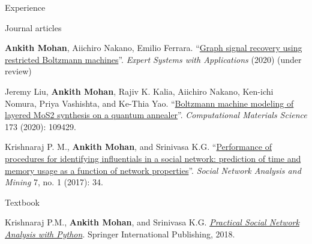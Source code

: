 \documentclass{resume} %
\begin{document}
\begin{rSection}{Experience}
\end{rSection}



\begin{rSection}{Journal articles}

\item \textbf{Ankith Mohan}, Aiichiro Nakano, Emilio Ferrara.
``\href{https://arxiv.org/pdf/2011.10549.pdf}{Graph signal recovery using restricted Boltzmann machines}''. 
{\it Expert Systems with Applications} (2020) (under review)

\item Jeremy Liu, \textbf{Ankith Mohan}, Rajiv K. Kalia, Aiichiro Nakano, Ken-ichi Nomura, Priya Vashishta, and Ke-Thia Yao. ``\href{http://cacs.usc.edu/papers/Liu-QLBM-CMS20.pdf}{Boltzmann machine modeling of layered MoS2 synthesis on a quantum annealer}''. {\em Computational Materials Science} 173 (2020): 109429.

\item Krishnaraj P. M., \textbf{Ankith Mohan}, and Srinivasa K.G. ``\href{https://www.researchgate.net/publication/318762687_Performance_of_procedures_for_identifying_influentials_in_a_social_network_prediction_of_time_and_memory_usage_as_a_function_of_network_properties}{Performance of procedures for identifying influentials in a social network: prediction of time and memory usage as a function of network properties}''. {\em Social Network Analysis and Mining} 7, no. 1 (2017): 34.

\end{rSection}
\begin{rSection}{Textbook}

\item Krishnaraj P.M., \textbf{Ankith Mohan}, and Srinivasa K.G. \href{https://link.springer.com/book/10.1007/978-3-319-96746-2}{\em Practical Social Network Analysis with Python}. Springer International Publishing, 2018.

\end{rSection}
\end{document}
